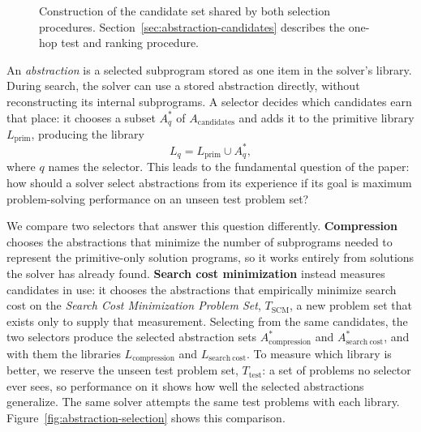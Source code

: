 \documentclass[10pt]{article}
\begin{document}
\begin{figure}[H]
  \centering
  \caption{Construction of the candidate set shared by both selection
  procedures. Section~\ref{sec:abstraction-candidates} describes the
  one-hop test and ranking procedure.}
  \label{fig:solver-experience}
\end{figure}

An \emph{abstraction} is a selected subprogram stored as one item in the
solver's library. During search, the solver can use a stored abstraction
directly, without reconstructing its internal subprograms. A selector decides
which candidates earn that place: it chooses a subset $A^{*}_q$ of
$A_{\mathrm{candidates}}$ and adds it to the primitive library
$L_{\mathrm{prim}}$, producing the library
\[
  L_q = L_{\mathrm{prim}} \cup A^{*}_q,
\]
where $q$ names the selector.
This leads to the fundamental question of the paper: how should a solver
select abstractions from its experience if its goal is maximum
problem-solving performance on an unseen test problem set?

We compare two selectors that answer this question differently.
\textbf{Compression} chooses the abstractions that minimize the number of
subprograms needed to represent the primitive-only solution programs, so it
works entirely from solutions the solver has already found. \textbf{Search
cost minimization} instead measures candidates in use: it chooses the
abstractions that empirically minimize search cost on the \emph{Search Cost
Minimization Problem Set}, $T_{\mathrm{SCM}}$, a new problem set
that exists only to supply that measurement. Selecting from the same
candidates, the two selectors produce the selected abstraction sets
$A^{*}_{\mathrm{compression}}$ and
$A^{*}_{\mathrm{search\ cost}}$, and with them the libraries
$L_{\mathrm{compression}}$ and $L_{\mathrm{search\ cost}}$. To measure which
library is better, we reserve the unseen test problem set,
$T_{\mathrm{test}}$: a set of problems no selector ever sees, so
performance on it shows how well the selected abstractions generalize. The
same solver attempts the same test problems with each library.
Figure~\ref{fig:abstraction-selection} shows this comparison.
\end{document}
